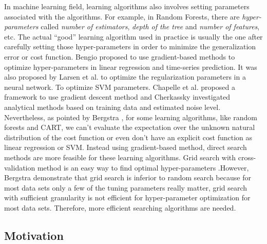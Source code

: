 In  machine learning field,  learning algorithms also involves setting parameters associated with the algorithms. For example, in Random Forests\cite{breiman2001random}, there are {\it hyper-parameters} called {\it number of estimators}, {\it depth of the tree} and {\it number of features}, etc. The actual ``good'' learning algorithm used in practice is usually the one after carefully setting those hyper-parameters in order to minimize the generalization error or cost function\cite{larsen1998adaptive,chapelle2002choosing,cherkassky2004practical,bengio2000gradient}. Bengio \cite{bengio2000gradient} proposed to use gradient-based methods to optimize hyper-parameters in linear regression and time-series prediction. It was also proposed by Larsen et al.\cite{larsen1998adaptive} to optimize the regularization parameters in a neural network. To optimize SVM parameters. Chapelle et al. proposed a framework to use gradient descent method\cite{chapelle2002choosing} and Cherkassky investigated analytical methods based on training data and estimated noise level\cite{cherkassky2004practical}. Nevertheless, as pointed by Bergstra \cite{Bergstra2012}, for some learning algorithms, like random forests and CART, we can't evaluate the expectation over the unknown natural distribution of the cost function or even don't have an explicit cost function as linear regression or SVM. Instead using gradient-based method, direct search methods are more feasible for these learning algorithms. Grid search with cross-validation method is an easy way to find optimal hyper-parameters \cite{lerman1980fitting,hsu2003practical,jimenez2009finding,akay2009support}.However, Bergstra \cite{Bergstra2012} demonstrate that grid search is inferior to random search because for most data sets only a few of the tuning parameters really matter, grid search with  sufficient granularity is not efficient for hyper-parameter optimization for most data sets. Therefore, more efficient searching algorithms are needed.

\subsection{Motivation}


